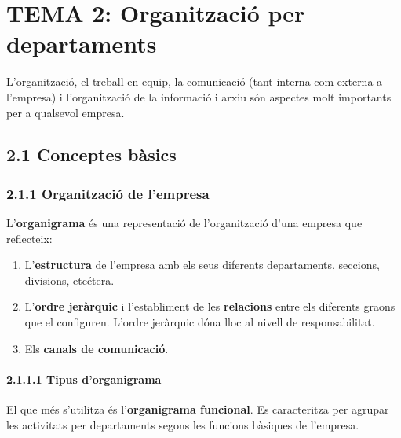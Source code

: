 \documentclass[
  a4paper,
  openany]{book}
\author{Fernando Verdú Primo}
\date{2022-01-07}
\begin{document}

\newpage

{
\setcounter{tocdepth}{1}
\tableofcontents
}
\hypertarget{tema-2-organitzaciuxf3-per-departaments}{%
\chapter{TEMA 2: Organització per departaments}\label{tema-2-organitzaciuxf3-per-departaments}}

L'organització, el treball en equip, la comunicació (tant interna com externa a l'empresa) i l'organització de la informació i arxiu són aspectes molt importants per a qualsevol empresa.

\hypertarget{conceptes-buxe0sics}{%
\section{2.1 Conceptes bàsics}\label{conceptes-buxe0sics}}

\hypertarget{organitzaciuxf3-de-lempresa}{%
\subsection{2.1.1 Organització de l'empresa}\label{organitzaciuxf3-de-lempresa}}

L'\textbf{organigrama} és una representació de l'organització d'una empresa que reflecteix:

\begin{enumerate}
\def\labelenumi{\alph{enumi}.}
\item
  L'\textbf{estructura} de l'empresa amb els seus diferents departaments, seccions, divisions, etcétera.
\item
  L'\textbf{ordre jeràrquic} i l'establiment de les \textbf{relacions} entre els diferents graons que el configuren. L'ordre jeràrquic dóna lloc al nivell de responsabilitat.
\item
  Els \textbf{canals de comunicació}.
\end{enumerate}

\hypertarget{tipus-dorganigrama}{%
\subsubsection{2.1.1.1 Tipus d'organigrama}\label{tipus-dorganigrama}}

El que més s'utilitza és l'\textbf{organigrama funcional}. Es caracteritza per agrupar les activitats per departaments segons les funcions bàsiques de l'empresa.
\end{document}
